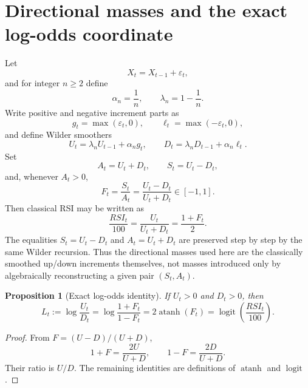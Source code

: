 \documentclass[11pt]{article}
\newtheorem{proposition}{Proposition}
\newcommand{\atanh}{\operatorname{atanh}}
\newcommand{\logit}{\operatorname{logit}}
\begin{document}
\section{Directional masses and the exact log-odds coordinate}
Let
\begin{equation}
X_t=X_{t-1}+\varepsilon_t,
\end{equation}
and for integer $n\ge2$ define
\begin{equation}
\alpha_n=\frac1n,\qquad \lambda_n=1-\frac1n.
\end{equation}
Write positive and negative increment parts as
\begin{equation}
g_t=\max(\varepsilon_t,0),\qquad \ell_t=\max(-\varepsilon_t,0),
\end{equation}
and define Wilder smoothers
\begin{equation}
U_t=\lambda_nU_{t-1}+\alpha_ng_t,
\qquad
D_t=\lambda_nD_{t-1}+\alpha_n\ell_t.
\end{equation}
Set
\begin{equation}
A_t=U_t+D_t,\qquad S_t=U_t-D_t,
\end{equation}
and, whenever $A_t>0$,
\begin{equation}
F_t=\frac{S_t}{A_t}=\frac{U_t-D_t}{U_t+D_t}\in[-1,1].
\end{equation}
Then classical RSI may be written as
\begin{equation}
\frac{RSI_t}{100}=\frac{U_t}{U_t+D_t}=\frac{1+F_t}{2}.
\end{equation}
The equalities $S_t=U_t-D_t$ and $A_t=U_t+D_t$ are preserved step by step by
the same Wilder recursion.  Thus the directional masses used here are the
classically smoothed up/down increments themselves, not masses introduced only
by algebraically reconstructing a given pair $(S_t,A_t)$.

\begin{proposition}[Exact log-odds identity]
If $U_t>0$ and $D_t>0$, then
\begin{equation}
L_t:=\log\frac{U_t}{D_t}
=\log\frac{1+F_t}{1-F_t}
=2\atanh(F_t)
=\logit\!\left(\frac{RSI_t}{100}\right).
\end{equation}
\end{proposition}

\begin{proof}
From $F=(U-D)/(U+D)$,
\[
1+F=\frac{2U}{U+D},\qquad 1-F=\frac{2D}{U+D}.
\]
Their ratio is $U/D$. The remaining identities are definitions of $\atanh$ and $\logit$.
\end{proof}
\end{document}
